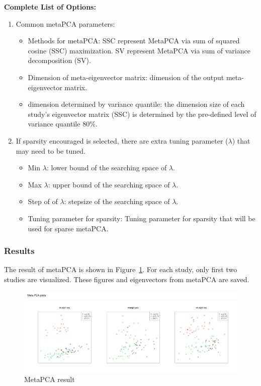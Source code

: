\textbf{Complete List of Options:} 
\begin{enumerate}
\item Common metaPCA parameters: 

\begin{itemize}
\item Methods for metaPCA:
SSC represent MetaPCA via sum of squared cosine (SSC) maximization.
SV represent MetaPCA via sum of variance decomposition (SV).
\item Dimension of meta-eigenvector matrix: dimension of the output meta-eigenvector matrix.
\item dimension determined by variance quantile:
the dimension size of each study's eigenvector matrix (SSC) is determined  by the pre-defined level of variance quantile 80\%.
\end{itemize}

\item If sparsity encouraged is selected, there are extra tuning parameter ($\lambda$) that may need to be tuned.

\begin{itemize}
\item  Min $\lambda$: lower bound of the searching space of $\lambda$.
\item Max $\lambda$: upper bound of the searching space of $\lambda$.
\item Step of of $\lambda$: stepsize of the searching space of $\lambda$.
\item Tuning parameter for sparsity: Tuning parameter for sparsity that will be used for sparse metaPCA.
\end{itemize}


\end{enumerate}


\subsubsection{Results}
The result of metaPCA is shown in Figure~\ref{fig:metaPCAresult}.
For each study, only first two studies are visualized.
These figures and eigenvectors from metaPCA are saved.

\begin{figure}[H]
\begin{center}
\includegraphics[scale=0.4]{./figure/metaPCA/metaPCA}
\caption{MetaPCA result}
\label{fig:metaPCAresult}
\end{center}
\end{figure}

